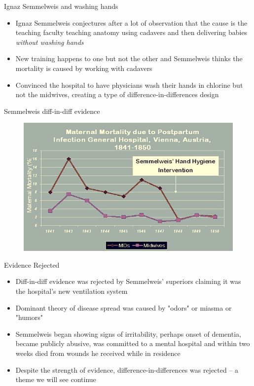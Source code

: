 \documentclass{beamer}
\begin{document}
\begin{frame}{Ignaz Semmelweis and washing hands}

\begin{itemize}
\item Ignaz Semmelweis conjectures after a lot of observation that the cause is the teaching faculty teaching anatomy using cadavers and then delivering babies \emph{without washing hands}
\item New training happens to one but not the other and Semmelweis thinks the mortality is caused by working with cadavers
\item Convinced the hospital to have physicians wash their hands in chlorine but not the midwives, creating a type of difference-in-differences design 
\end{itemize}

\end{frame}

\begin{frame}{Semmelweis diff-in-diff evidence}

	\begin{figure}
	\includegraphics[scale=0.5]{./lecture_includes/semmelweis_graph.jpg}
	\end{figure}


\end{frame}

\begin{frame}{Evidence Rejected}

\begin{itemize}

\item Diff-in-diff evidence was rejected by Semmelweis' superiors claiming it was the hospital's new ventilation system
\item Dominant theory of disease spread was caused by "odors" or miasma or "humors"
\item Semmelweis began showing signs of irritability, perhaps onset of dementia, became publicly abusive, was committed to a mental hospital and within two weeks died from wounds he received while in residence
\item Despite the strength of evidence, difference-in-differences was rejected -- a theme we will see continue

\end{itemize}

\end{frame}
\end{document}
